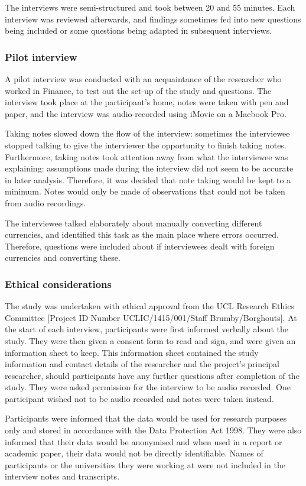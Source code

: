 \documentclass[11pt,oneside]{report}
\begin{document}
The interviews were semi-structured and took between 20 and 55 minutes. Each interview was reviewed afterwards, and findings sometimes fed into new questions being included or some questions being adapted in subsequent interviews.

\subsubsection{Pilot interview}
A pilot interview was conducted with an acquaintance of the researcher who worked in Finance, to test out the set-up of the study and questions. The interview took place at the participant's home, notes were taken with pen and paper, and the interview was audio-recorded using iMovie on a Macbook Pro. 

Taking notes slowed down the flow of the interview: sometimes the interviewee stopped talking to give the interviewer the opportunity to finish taking notes. Furthermore, taking notes took attention away from what the interviewee was explaining: assumptions made during the interview did not seem to be accurate in later analysis. Therefore, it was decided that note taking would be kept to a minimum. Notes would only be made of observations that could not be taken from audio recordings.

The interviewee talked elaborately about manually converting different currencies, and identified this task as the main place where errors occurred. Therefore, questions were included about if interviewees dealt with foreign currencies and converting these. 

\subsubsection{Ethical considerations}
The study was undertaken with ethical approval from the UCL Research Ethics Committee [Project ID Number UCLIC/1415/001/Staff Brumby/Borghouts]. 
At the start of each interview, participants were first informed verbally about the study. They were then given a consent form to read and sign, and were given an information sheet to keep. This information sheet contained the study information and contact details of the researcher and the project's principal researcher, should participants have any further questions after completion of the study.  They were asked permission for the interview to be audio recorded. One participant wished not to be audio recorded and notes were taken instead. 

Participants were informed that the data would be used for research purposes only and stored in accordance with the Data Protection Act 1998. They were also informed that their data would be anonymised and when used in a report or academic paper, their data would not be directly identifiable. Names of participants or the universities they were working at were not included in the interview notes and transcripts.
 
\end{document}
